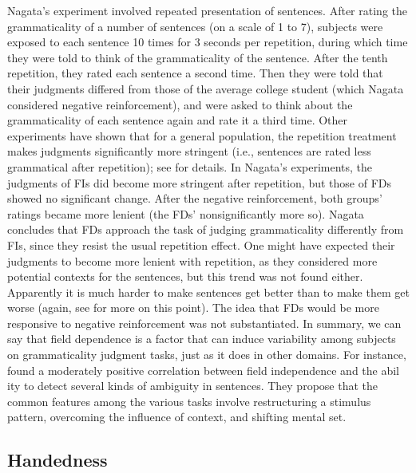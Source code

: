 Nagata's experiment involved repeated presentation of sentences. After rating the grammaticality of a number of sentences (on a scale of 1 to 7), subjects were exposed to each sentence 10 times for 3 seconds per repetition, during which time they were told to think of the grammaticality of the sentence. After the tenth repetition, they rated each sentence a second time. Then they were told that their judgments differed from those of the average college student (which Nagata considered negative reinforcement), and were asked to think about the grammaticality of each sentence again and rate it a third time. Other experiments have shown that for a general population, the repetition treatment makes judgments significantly more stringent (i.e., sentences are rated less grammatical after repetition); see  for details. In Nagata's experiments, the judgments of FIs did become more stringent after repetition, but those of FDs showed no significant change. After the negative reinforcement, both groups' ratings became more lenient (the FDs' nonsignificantly more so). Nagata concludes that FDs approach the task of judging grammaticality differently from FIs, since they resist the usual repetition effect. One might have expected their judgments to become more lenient with repetition, as they considered more potential contexts for the sentences, but this trend was not found either. Apparently it is much harder to make sentences get better than to make them get worse (again, see  for more on this point). The idea that FDs would be more responsive to negative reinforcement was not substantiated. In summary, we can say that field dependence is a factor that can induce variability among subjects on grammaticality judgment tasks, just as it does in other domains. For instance, \citet{LefeverEtAl1976} found a moderately positive correlation between field independence and the abil%
ity to detect several kinds of ambiguity in sentences. They propose that the common features among the various tasks involve restructuring a stimulus pattern, overcoming the influence of context, and shifting mental set.

\subsection{Handedness}\label{sec:4.3.2}

